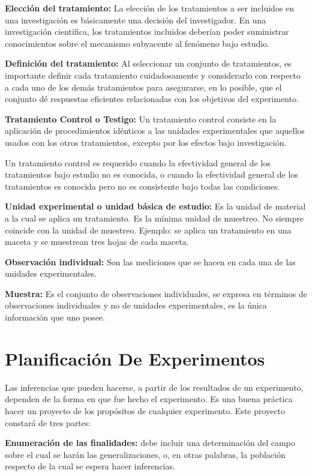 \documentclass[]{book}
\theoremstyle{definition}
\theoremstyle{definition}
\theoremstyle{definition}
\theoremstyle{remark}
\begin{document}
\textbf{Elección del tratamiento:} La elección de los tratamientos a ser
incluidos en una investigación es básicamente una decisión del
investigador. En una investigación científica, los tratamientos
incluidos deberían poder suministrar conocimientos sobre el mecanismo
subyacente al fenómeno bajo estudio.

\textbf{Definición del tratamiento:} Al seleccionar un conjunto de
tratamientos, es importante definir cada tratamiento cuidadosamente y
considerarlo con respecto a cada uno de los demás tratamientos para
asegurarse, en lo posible, que el conjunto dé respuestas eficientes
relacionadas con los objetivos del experimento.

\textbf{Tratamiento Control o Testigo:} Un tratamiento control consiste
en la aplicación de procedimientos idénticos a las unidades
experimentales que aquellos usados con los otros tratamientos, excepto
por los efectos bajo investigación.

Un tratamiento control es requerido cuando la efectividad general de los
tratamientos bajo estudio no es conocida, o cuando la efectividad
general de los tratamientos es conocida pero no es consistente bajo
todas las condiciones.

\textbf{Unidad experimental o unidad básica de estudio:} Es la unidad de
material a la cual se aplica un tratamiento. Es la mínima unidad de
muestreo. No siempre coincide con la unidad de muestreo. Ejemplo: se
aplica un tratamiento en una maceta y se muestrean tres hojas de cada
maceta.

\textbf{Observación individual:} Son las mediciones que se hacen en cada
una de las unidades experimentales.

\textbf{Muestra:} Es el conjunto de observaciones individuales, se
expresa en términos de observaciones individuales y no de unidades
experimentales, es la única información que uno posee.

\hypertarget{planificacion-de-experimentos}{%
\section{Planificación De
Experimentos}\label{planificacion-de-experimentos}}

Las inferencias que pueden hacerse, a partir de los resultados de un
experimento, dependen de la forma en que fue hecho el experimento. Es
una buena práctica hacer un proyecto de los propósitos de cualquier
experimento. Este proyecto constará de tres partes:

\textbf{Enumeración de las finalidades:} debe incluir una determinación
del campo sobre el cual se harán las generalizaciones, o, en otras
palabras, la población respecto de la cual se espera hacer inferencias.
\end{document}
